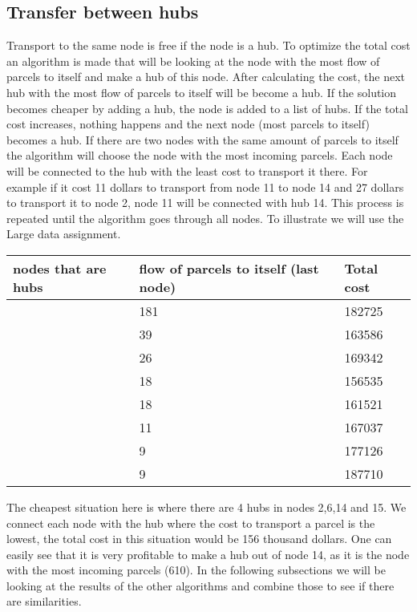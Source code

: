 \documentclass{article}
\begin{document}
\subsection{Transfer between hubs}
Transport to the same node is free if the node is a hub. To optimize the total cost an algorithm is made that will be looking at the node with the most flow of parcels to itself and make a hub of this node. After calculating the cost, the next hub with the most flow of parcels to itself will be become a hub. If the solution becomes cheaper by adding a hub, the node is added to a list of hubs. If the total cost increases, nothing happens and the next node (most parcels to itself) becomes a hub. If there are two nodes with the same amount of parcels to itself the algorithm will choose the node with the most incoming parcels. Each node will be connected to the hub with the least cost to transport it there. For example if it cost 11 dollars to transport from node 11 to node 14 and 27 dollars to transport it to node 2, node 11 will be connected with hub 14. This process is repeated until the algorithm goes through all nodes. To illustrate we will use the Large data assignment.

\begin{table}[h]
\begin{tabular}{|p{3cm}|p{3cm}|p{3cm}|}
\hline
nodes that are hubs & flow of parcels to itself (last node) & Total cost\\
\hline
[14] &  181 & 182725 \\
\hline
[14,2]   & 39 & 163586 \\
\hline
[14,2,15] & 26 & 169342 \\
\hline
[14,2,15,6]  & 18 & 156535 \\
\hline
[14,2,15,6,13] & 18 & 161521\\
\hline
[14,2,15,6,13,4] & 11 & 167037   \\
\hline
[14,2,15,6,13,4,3] & 9 & 177126   \\
\hline
[14,2,15,6,13,4,3,9] & 9 & 187710    \\
\end{tabular}
\end{table}


The cheapest situation here is where there are 4 hubs in nodes 2,6,14 and 15. We connect each node with the hub where the cost to transport a parcel is the lowest, the total cost in this situation would be 156 thousand dollars. One can easily see that it is very profitable to make a hub out of node 14, as it is the node with the most incoming parcels (610). In the following subsections we will be looking at the results of the other algorithms and combine those to see if there are similarities.
    
\end{document}
